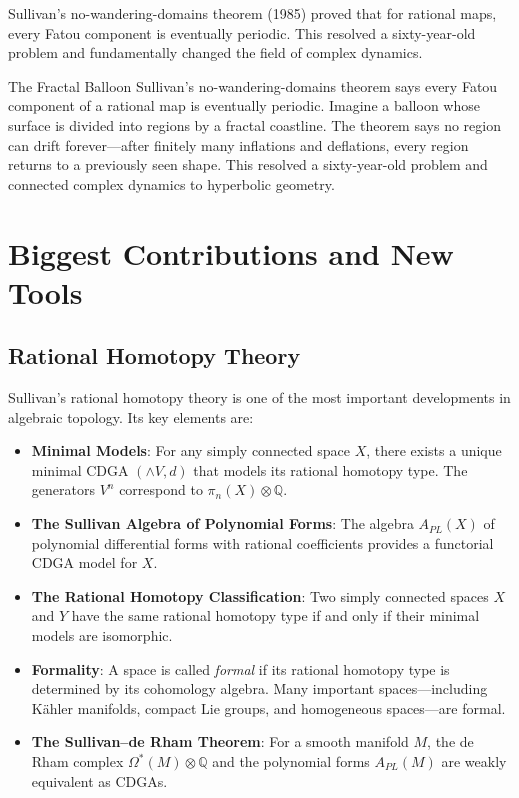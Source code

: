 Sullivan's no-wandering-domains theorem (1985) proved that for rational maps, every Fatou component is eventually periodic. This resolved a sixty-year-old problem and fundamentally changed the field of complex dynamics.

\begin{analogy}{The Fractal Balloon}
Sullivan's no-wandering-domains theorem says every Fatou component of a rational map is eventually periodic. Imagine a balloon whose surface is divided into regions by a fractal coastline. The theorem says no region can drift forever---after finitely many inflations and deflations, every region returns to a previously seen shape. This resolved a sixty-year-old problem and connected complex dynamics to hyperbolic geometry.
\end{analogy}

\section{Biggest Contributions and New Tools}

\subsection{Rational Homotopy Theory}

Sullivan's rational homotopy theory is one of the most important developments in algebraic topology. Its key elements are:

\begin{itemize}
\item \textbf{Minimal Models}: For any simply connected space $X$, there exists a unique minimal CDGA $(\wedge V, d)$ that models its rational homotopy type. The generators $V^n$ correspond to $\pi_n(X) \otimes \mathbb{Q}$.

\item \textbf{The Sullivan Algebra of Polynomial Forms}: The algebra $A_{PL}(X)$ of polynomial differential forms with rational coefficients provides a functorial CDGA model for $X$.

\item \textbf{The Rational Homotopy Classification}: Two simply connected spaces $X$ and $Y$ have the same rational homotopy type if and only if their minimal models are isomorphic.

\item \textbf{Formality}: A space is called \emph{formal} if its rational homotopy type is determined by its cohomology algebra. Many important spaces---including K\"ahler manifolds, compact Lie groups, and homogeneous spaces---are formal.

\item \textbf{The Sullivan--de Rham Theorem}: For a smooth manifold $M$, the de Rham complex $\Omega^*(M) \otimes \mathbb{Q}$ and the polynomial forms $A_{PL}(M)$ are weakly equivalent as CDGAs.
\end{itemize}

